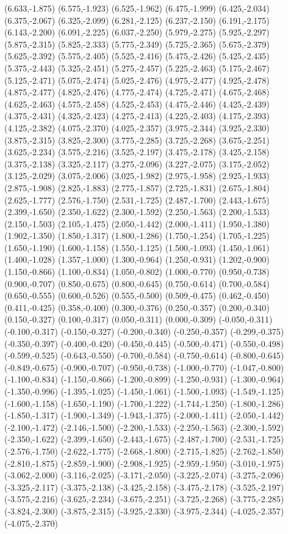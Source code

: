 (6.633,-1.875) (6.575,-1.923) (6.525,-1.962) (6.475,-1.999) (6.425,-2.034) (6.375,-2.067) (6.325,-2.099) (6.281,-2.125) (6.237,-2.150) (6.191,-2.175) (6.143,-2.200) (6.091,-2.225) (6.037,-2.250) (5.979,-2.275) (5.925,-2.297) (5.875,-2.315) (5.825,-2.333) (5.775,-2.349) (5.725,-2.365) (5.675,-2.379) (5.625,-2.392) (5.575,-2.405) (5.525,-2.416) (5.475,-2.426) (5.425,-2.435) (5.375,-2.443) (5.325,-2.451) (5.275,-2.457) (5.225,-2.463) (5.175,-2.467) (5.125,-2.471) (5.075,-2.474) (5.025,-2.476) (4.975,-2.477) (4.925,-2.478) (4.875,-2.477) (4.825,-2.476) (4.775,-2.474) (4.725,-2.471) (4.675,-2.468) (4.625,-2.463) (4.575,-2.458) (4.525,-2.453) (4.475,-2.446) (4.425,-2.439) (4.375,-2.431) (4.325,-2.423) (4.275,-2.413) (4.225,-2.403) (4.175,-2.393) (4.125,-2.382) (4.075,-2.370) (4.025,-2.357) (3.975,-2.344) (3.925,-2.330) (3.875,-2.315) (3.825,-2.300) (3.775,-2.285) (3.725,-2.268) (3.675,-2.251) (3.625,-2.234) (3.575,-2.216) (3.525,-2.197) (3.475,-2.178) (3.425,-2.158) (3.375,-2.138) (3.325,-2.117) (3.275,-2.096) (3.227,-2.075) (3.175,-2.052) (3.125,-2.029) (3.075,-2.006) (3.025,-1.982) (2.975,-1.958) (2.925,-1.933) (2.875,-1.908) (2.825,-1.883) (2.775,-1.857) (2.725,-1.831) (2.675,-1.804) (2.625,-1.777) (2.576,-1.750) (2.531,-1.725) (2.487,-1.700) (2.443,-1.675) (2.399,-1.650) (2.350,-1.622) (2.300,-1.592) (2.250,-1.563) (2.200,-1.533) (2.150,-1.503) (2.105,-1.475) (2.050,-1.442) (2.000,-1.411) (1.950,-1.380) (1.902,-1.350) (1.850,-1.317) (1.800,-1.286) (1.750,-1.254) (1.705,-1.225) (1.650,-1.190) (1.600,-1.158) (1.550,-1.125) (1.500,-1.093) (1.450,-1.061) (1.400,-1.028) (1.357,-1.000) (1.300,-0.964) (1.250,-0.931) (1.202,-0.900) (1.150,-0.866) (1.100,-0.834) (1.050,-0.802) (1.000,-0.770) (0.950,-0.738) (0.900,-0.707) (0.850,-0.675) (0.800,-0.645) (0.750,-0.614) (0.700,-0.584) (0.650,-0.555) (0.600,-0.526) (0.555,-0.500) (0.509,-0.475) (0.462,-0.450) (0.411,-0.425) (0.358,-0.400) (0.300,-0.376) (0.250,-0.357) (0.200,-0.340) (0.150,-0.327) (0.100,-0.317) (0.050,-0.311) (0.000,-0.309) (-0.050,-0.311) (-0.100,-0.317) (-0.150,-0.327) (-0.200,-0.340) (-0.250,-0.357) (-0.299,-0.375) (-0.350,-0.397) (-0.400,-0.420) (-0.450,-0.445) (-0.500,-0.471) (-0.550,-0.498) (-0.599,-0.525) (-0.643,-0.550) (-0.700,-0.584) (-0.750,-0.614) (-0.800,-0.645) (-0.849,-0.675) (-0.900,-0.707) (-0.950,-0.738) (-1.000,-0.770) (-1.047,-0.800) (-1.100,-0.834) (-1.150,-0.866) (-1.200,-0.899) (-1.250,-0.931) (-1.300,-0.964) (-1.350,-0.996) (-1.395,-1.025) (-1.450,-1.061) (-1.500,-1.093) (-1.549,-1.125) (-1.600,-1.158) (-1.650,-1.190) (-1.700,-1.222) (-1.744,-1.250) (-1.800,-1.286) (-1.850,-1.317) (-1.900,-1.349) (-1.943,-1.375) (-2.000,-1.411) (-2.050,-1.442) (-2.100,-1.472) (-2.146,-1.500) (-2.200,-1.533) (-2.250,-1.563) (-2.300,-1.592) (-2.350,-1.622) (-2.399,-1.650) (-2.443,-1.675) (-2.487,-1.700) (-2.531,-1.725) (-2.576,-1.750) (-2.622,-1.775) (-2.668,-1.800) (-2.715,-1.825) (-2.762,-1.850) (-2.810,-1.875) (-2.859,-1.900) (-2.908,-1.925) (-2.959,-1.950) (-3.010,-1.975) (-3.062,-2.000) (-3.116,-2.025) (-3.171,-2.050) (-3.225,-2.074) (-3.275,-2.096) (-3.325,-2.117) (-3.375,-2.138) (-3.425,-2.158) (-3.475,-2.178) (-3.525,-2.197) (-3.575,-2.216) (-3.625,-2.234) (-3.675,-2.251) (-3.725,-2.268) (-3.775,-2.285) (-3.824,-2.300) (-3.875,-2.315) (-3.925,-2.330) (-3.975,-2.344) (-4.025,-2.357) (-4.075,-2.370) 